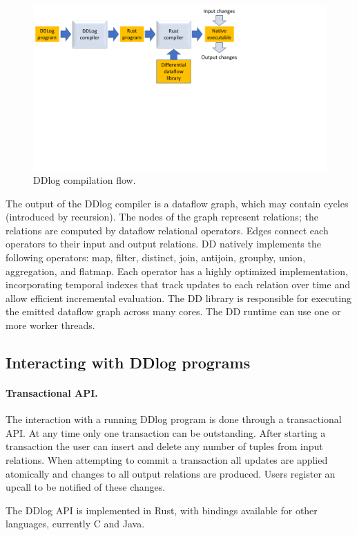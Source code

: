\begin{figure}
\begin{center}
    \includegraphics[width=.6\columnwidth,clip=true,trim=0in 4in 4in
      0in]{compiler-flow.pdf}
\end{center}
    \caption{DDlog compilation flow.\label{fig:compiler-flow}}
\end{figure}

The output of the DDlog compiler is a dataflow graph, which may
contain cycles (introduced by recursion).  The nodes of the graph
represent relations; the relations are computed by dataflow relational
operators.  Edges connect each operators to their input and output
relations.  DD natively implements the following operators: map,
filter, distinct, join, antijoin, groupby, union, aggregation, and
flatmap.  Each operator has a highly optimized implementation,
incorporating temporal indexes that track updates to each relation
over time and allow efficient incremental evaluation.  The DD library
is responsible for executing the emitted dataflow graph across many
cores.  The DD runtime can use one or more worker threads.

\subsection{Interacting with DDlog programs}

\paragraph{Transactional API.}
The interaction with a running DDlog program is done through a
transactional API.  At any time only one transaction can be
outstanding.  After starting a transaction the user can insert and
delete any number of tuples from input relations.  When attempting to
commit a transaction all updates are applied atomically and changes to
all output relations are produced.  Users register an upcall to be
notified of these changes.

The DDlog API is implemented in Rust, with bindings available for
other languages, currently C and Java.

